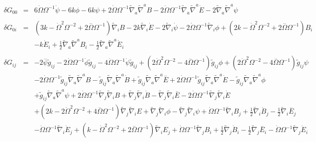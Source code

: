 \documentclass[10pt,letterpaper]{article}
\numberwithin{equation}{section}
\begin{document}
\begin{eqnarray}
\delta G_{00}&=& 6 \dot{\Omega} \Omega^{-1} \dot{\psi} - 6 k \phi - 6 k \psi + 2 \dot{\Omega} \Omega^{-1} \tilde{\nabla}_{a}\tilde{\nabla}^{a}B - 2 \dot{\Omega} \Omega^{-1} \tilde{\nabla}_{a}\tilde{\nabla}^{a}\dot{E} - 2 \tilde{\nabla}_{a}\tilde{\nabla}^{a}\psi 
\\  \nonumber\\ 
\delta G_{0i}&=& (3 k -  \dot{\Omega}^2 \Omega^{-2} + 2 \overset{..}{\Omega} \Omega^{-1}) \tilde{\nabla}_{i}B - 2 k \tilde{\nabla}_{i}\dot{E} - 2 \tilde{\nabla}_{i}\dot{\psi} - 2 \dot{\Omega} \Omega^{-1} \tilde{\nabla}_{i}\phi +(2 k -  \dot{\Omega}^2 \Omega^{-2} + 2 \overset{..}{\Omega} \Omega^{-1}) B_{i} \nonumber \\ 
&& -  k \dot{E}_{i} + \tfrac{1}{2} \tilde{\nabla}_{a}\tilde{\nabla}^{a}B_{i} -  \tfrac{1}{2} \tilde{\nabla}_{a}\tilde{\nabla}^{a}\dot{E}_{i}
\\  \nonumber\\ 
\delta G_{ij}&=& -2 \overset{..}{\psi} \tilde{g}_{ij} - 2 \dot{\Omega} \Omega^{-1} \dot{\phi} \tilde{g}_{ij} - 4 \dot{\Omega} \Omega^{-1} \dot{\psi} \tilde{g}_{ij} + (2 \dot{\Omega}^2 \Omega^{-2} - 4 \overset{..}{\Omega} \Omega^{-1}) \tilde{g}_{ij} \phi + (2 \dot{\Omega}^2 \Omega^{-2} - 4 \overset{..}{\Omega} \Omega^{-1}) \tilde{g}_{ij} \psi \nonumber \\ 
&& - 2 \dot{\Omega} \Omega^{-1} \tilde{g}_{ij} \tilde{\nabla}_{a}\tilde{\nabla}^{a}B -  \tilde{g}_{ij} \tilde{\nabla}_{a}\tilde{\nabla}^{a}\dot{B} + \tilde{g}_{ij} \tilde{\nabla}_{a}\tilde{\nabla}^{a}\overset{..}{E} + 2 \dot{\Omega} \Omega^{-1} \tilde{g}_{ij} \tilde{\nabla}_{a}\tilde{\nabla}^{a}\dot{E} -  \tilde{g}_{ij} \tilde{\nabla}_{a}\tilde{\nabla}^{a}\phi \nonumber \\ 
&& + \tilde{g}_{ij} \tilde{\nabla}_{a}\tilde{\nabla}^{a}\psi + 2 \dot{\Omega} \Omega^{-1} \tilde{\nabla}_{j}\tilde{\nabla}_{i}B + \tilde{\nabla}_{j}\tilde{\nabla}_{i}\dot{B} -  \tilde{\nabla}_{j}\tilde{\nabla}_{i}\overset{..}{E} - 2 \dot{\Omega} \Omega^{-1} \tilde{\nabla}_{j}\tilde{\nabla}_{i}\dot{E} \nonumber \\ 
&& + (2 k - 2 \dot{\Omega}^2 \Omega^{-2} + 4 \overset{..}{\Omega} \Omega^{-1}) \tilde{\nabla}_{j}\tilde{\nabla}_{i}E + \tilde{\nabla}_{j}\tilde{\nabla}_{i}\phi -  \tilde{\nabla}_{j}\tilde{\nabla}_{i}\psi +\dot{\Omega} \Omega^{-1} \tilde{\nabla}_{i}B_{j} + \tfrac{1}{2} \tilde{\nabla}_{i}\dot{B}_{j} -  \tfrac{1}{2} \tilde{\nabla}_{i}\overset{..}{E}_{j} \nonumber \\ 
&& -  \dot{\Omega} \Omega^{-1} \tilde{\nabla}_{i}\dot{E}_{j} + (k -  \dot{\Omega}^2 \Omega^{-2} + 2 \overset{..}{\Omega} \Omega^{-1}) \tilde{\nabla}_{i}E_{j} + \dot{\Omega} \Omega^{-1} \tilde{\nabla}_{j}B_{i} + \tfrac{1}{2} \tilde{\nabla}_{j}\dot{B}_{i} -  \tfrac{1}{2} \tilde{\nabla}_{j}\overset{..}{E}_{i} -  \dot{\Omega} \Omega^{-1} \tilde{\nabla}_{j}\dot{E}_{i} \nonumber \\ 

\end{eqnarray}
\end{document}
